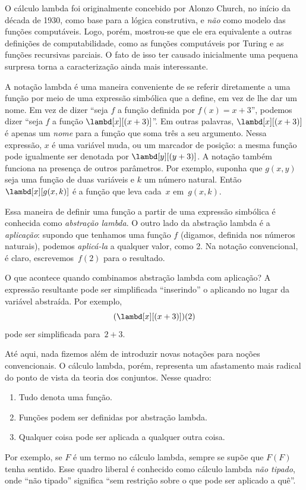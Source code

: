 \documentclass[../../../include/open-logic-section]{subfiles}
\begin{document}

O cálculo lambda foi originalmente concebido por Alonzo Church, no início
da década de 1930, como base para a lógica construtiva, e \emph{não} como
modelo das funções computáveis. Logo, porém, mostrou-se que ele era
equivalente a outras definições de computabilidade, como as funções
computáveis por Turing e as funções recursivas parciais. O fato de isso ter
causado inicialmente uma pequena surpresa torna a caracterização ainda mais
interessante.

A notação lambda é uma maneira conveniente de se referir diretamente a uma
função por meio de uma expressão simbólica que a define, em vez de lhe dar
um nome. Em vez de dizer ``seja $f$ a função definida por
$f(x) = x + 3$'', podemos dizer ``seja $f$ a função
$\lambd[x][(x + 3)]$''. Em outras palavras, $\lambd[x][(x+3)]$ é apenas um
\emph{nome} para a função que soma três a seu argumento. Nessa expressão,
$x$ é uma variável muda, ou um marcador de posição: a mesma função pode
igualmente ser denotada por $\lambd[y][(y + 3)]$. A notação também funciona
na presença de outros parâmetros. Por exemplo, suponha que $g(x, y)$ seja
uma função de duas variáveis e $k$ um número natural. Então
$\lambd[x][g(x,k)]$ é a função que leva cada~$x$ em~$g(x, k)$.

Essa maneira de definir uma função a partir de uma expressão simbólica é
conhecida como \emph{abstração lambda}. O outro lado da abstração lambda é a
\emph{aplicação}: supondo que tenhamos uma função $f$ (digamos, definida nos
números naturais), podemos \emph{aplicá-la} a qualquer valor, como 2. Na
notação convencional, é claro, escrevemos~$f(2)$ para o resultado.

O que acontece quando combinamos abstração lambda com aplicação? A
expressão resultante pode ser simplificada ``inserindo'' o aplicando no
lugar da variável abstraída. Por exemplo,
\[
(\lambd[x][(x + 3)])(2)
\]
pode ser simplificada para~$2 + 3$.

Até aqui, nada fizemos além de introduzir novas notações para noções
convencionais. O cálculo lambda, porém, representa um afastamento mais
radical do ponto de vista da teoria dos conjuntos. Nesse quadro:
\begin{enumerate}
\item Tudo denota uma função.
\item Funções podem ser definidas por abstração lambda.
\item Qualquer coisa pode ser aplicada a qualquer outra coisa.
\end{enumerate}
Por exemplo, se $F$ é um termo no cálculo lambda, sempre se supõe que $F(F)$
tenha sentido. Esse quadro liberal é conhecido como cálculo lambda
\emph{não tipado}, onde ``não tipado'' significa ``sem restrição sobre o que
pode ser aplicado a quê''.
\end{document}
